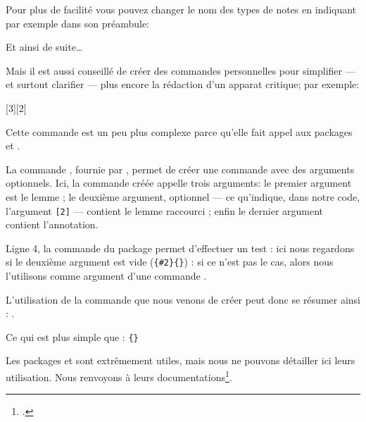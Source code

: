 Pour plus de facilité vous pouvez changer le nom des types de notes en indiquant par exemple dans son préambule: 
\begin{latexcode}
\let\variantes\Afootnote
\let\citations\Bfootnote
\let\eclaircissements\footnoteA
Et ainsi de suite…
\end{latexcode}

Mais il est aussi conseillé de créer des commandes personnelles pour simplifier   --- et surtout clarifier --- plus encore la rédaction d'un apparat critique; par exemple:

\begin{latexcode}
\usepackage{ifthen, xargs}
[3][2]{%
    }
\end{latexcode}

Cette commande est un peu plus complexe parce qu'elle fait appel aux packages  et . 

La commande , fournie par , permet de créer une commande avec des arguments optionnels. Ici, la commande créée appelle trois arguments: le premier argument est le lemme ; le deuxième argument, optionnel --- ce qu'indique,  dans notre code, l'argument \verb=[2]= --- contient le lemme raccourci ; enfin le dernier argument contient l'annotation.

Ligne 4, la commande  du package  permet d'effectuer un test : ici nous regardons si le deuxième argument est vide (\verb={#2}{}=) : si ce n'est pas le cas, alors nous l'utilisons  comme argument d'une commande .

 L'utilisation de la commande que nous venons de créer peut donc se résumer ainsi : 
 . 

Ce qui est  plus simple que :
\verb|{|\verb|}|

\begin{plusloins}
Les packages  et  sont extrêmement utiles, mais nous ne pouvons détailler ici leurs utilisation. Nous renvoyons à leurs documentations\footcites{ifthen}{xargs}.
\end{plusloins}





